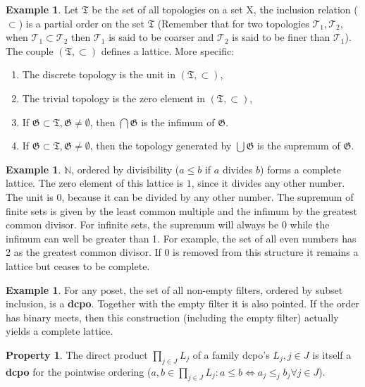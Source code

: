 \documentclass[a4paper,12pt]{article}
\theoremstyle{definition}
\newtheorem{example}[theorem]{Example}
\newtheorem{property}[theorem]{Property}
\newcommand{\N}{{\mathbb N}}
\begin{document}
\begin{example}
Let $\mathfrak{T}$ be the set of all topologies on a set X, the inclusion relation ($\subset$) is a partial order on the set $\mathfrak{T}$ (Remember that for two topologies $\mathcal{T}_1, \mathcal{T}_2$, when $\mathcal{T}_1 \subset \mathcal{T}_2$ then $\mathcal{T}_1$ is said to be coarser and $\mathcal{T}_2$ is said to be finer than $\mathcal{T}_1$). The couple $(\mathfrak{T}, \subset)$ defines a lattice. More specific:
\begin{enumerate}
  \item The discrete topology is the unit in $(\mathfrak{T}, \subset)$,
  \item The trivial topology is the zero element in $(\mathfrak{T}, \subset)$,
  \item If $\mathfrak{G} \subset \mathfrak{T}, \mathfrak{G} \neq \emptyset$, then $\bigcap \mathfrak{G}$ is the infimum of $\mathfrak{G}$.

  \item If $\mathfrak{G} \subset \mathfrak{T}, \mathfrak{G} \neq \emptyset$, then the topology generated by $\bigcup \mathfrak{G}$ is the supremum of $\mathfrak{G}$.
\end{enumerate}
\end{example}

\begin{example}
$\N$, ordered by divisibility ($a \leq b$ if $a$ divides $b$) forms a complete lattice. The zero element of this lattice is $1$, since it divides any other number. The unit is 0, because it can be divided by any other number. The supremum of finite sets is given by the least common multiple and the infimum by the greatest common divisor. For infinite sets, the supremum will always be 0 while the infimum can well be greater than 1. For example, the set of all even numbers has 2 as the greatest common divisor. If 0 is removed from this structure it remains a lattice but ceases to be complete.
\end{example}

\begin{example}
For any poset, the set of all non-empty filters, ordered by subset inclusion, is a \textbf{dcpo}. Together with the empty filter it is also pointed. If the order has binary meets, then this construction (including the empty filter) actually yields a complete lattice.
\end{example}

\begin{property}\label{directeproducten}
The direct product $\prod_{j\in J}L_j$ of a family dcpo's $L_j, j \in J$ is itself a \textbf{dcpo} for the pointwise ordering ($a, b \in \prod_{j\in J}L_j: a \leq b \Leftrightarrow a_j \leq_j b_j \forall j \in J$).
\end{property}
\end{document}
